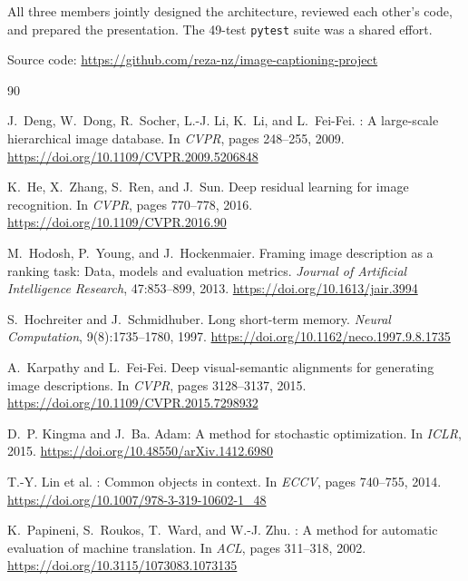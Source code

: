 \documentclass{article}
\begin{document}
All three members jointly designed the architecture, reviewed each other's code,
and prepared the presentation. The 49-test \texttt{pytest} suite was a shared
effort.

\medskip\noindent
Source code: \url{https://github.com/reza-nz/image-captioning-project}

\newpage


\begin{thebibliography}{90}

J.~Deng, W.~Dong, R.~Socher, L.-J. Li, K.~Li, and L.~Fei-Fei.
: A large-scale hierarchical image database.
\newblock In \emph{CVPR}, pages 248--255, 2009.
\newblock \url{https://doi.org/10.1109/CVPR.2009.5206848}

K.~He, X.~Zhang, S.~Ren, and J.~Sun.
\newblock Deep residual learning for image recognition.
\newblock In \emph{CVPR}, pages 770--778, 2016.
\newblock \url{https://doi.org/10.1109/CVPR.2016.90}

M.~Hodosh, P.~Young, and J.~Hockenmaier.
\newblock Framing image description as a ranking task: Data, models and evaluation metrics.
\newblock \emph{Journal of Artificial Intelligence Research}, 47:853--899, 2013.
\newblock \url{https://doi.org/10.1613/jair.3994}

S.~Hochreiter and J.~Schmidhuber.
\newblock Long short-term memory.
\newblock \emph{Neural Computation}, 9(8):1735--1780, 1997.
\newblock \url{https://doi.org/10.1162/neco.1997.9.8.1735}

A.~Karpathy and L.~Fei-Fei.
\newblock Deep visual-semantic alignments for generating image descriptions.
\newblock In \emph{CVPR}, pages 3128--3137, 2015.
\newblock \url{https://doi.org/10.1109/CVPR.2015.7298932}

D.~P. Kingma and J.~Ba.
\newblock Adam: A method for stochastic optimization.
\newblock In \emph{ICLR}, 2015.
\newblock \url{https://doi.org/10.48550/arXiv.1412.6980}

T.-Y. Lin et al.
: Common objects in context.
\newblock In \emph{ECCV}, pages 740--755, 2014.
\newblock \url{https://doi.org/10.1007/978-3-319-10602-1_48}

K.~Papineni, S.~Roukos, T.~Ward, and W.-J. Zhu.
: A method for automatic evaluation of machine translation.
\newblock In \emph{ACL}, pages 311--318, 2002.
\newblock \url{https://doi.org/10.3115/1073083.1073135}


\end{thebibliography}
\end{document}
